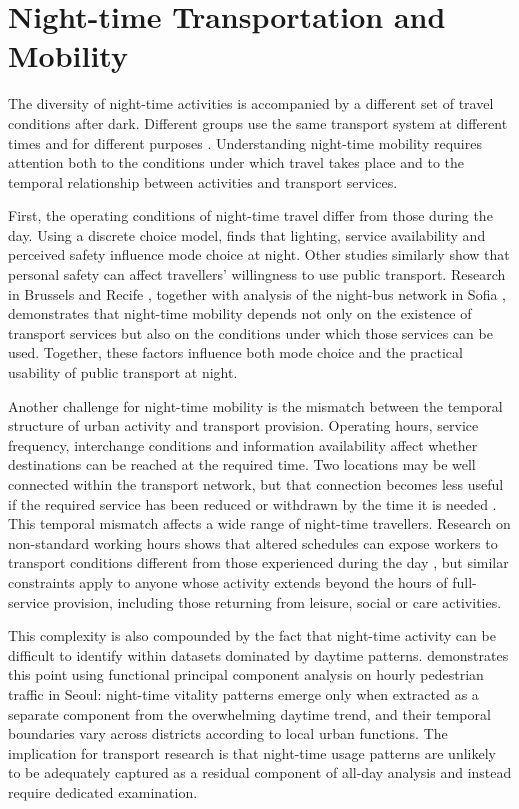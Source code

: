 \section{Night-time Transportation and Mobility}

The diversity of night-time activities is accompanied by a different set of travel conditions after dark. Different groups use the same transport system at different times and for different purposes \citep{Shaw2022,Palm2023}. Understanding night-time mobility requires attention both to the conditions under which travel takes place and to the temporal relationship between activities and transport services.

First, the operating conditions of night-time travel differ from those during the day. Using a discrete choice model, \citet{Kapitza2022} finds that lighting, service availability and perceived safety influence mode choice at night. Other studies similarly show that personal safety can affect travellers' willingness to use public transport. Research in Brussels and Recife \citep{Farina2022}, together with analysis of the night-bus network in Sofia \citep{Plyushteva2020}, demonstrates that night-time mobility depends not only on the existence of transport services but also on the conditions under which those services can be used. Together, these factors influence both mode choice and the practical usability of public transport at night.

Another challenge for night-time mobility is the mismatch between the temporal structure of urban activity and transport provision. Operating hours, service frequency, interchange conditions and information availability affect whether destinations can be reached at the required time. Two locations may be well connected within the transport network, but that connection becomes less useful if the required service has been reduced or withdrawn by the time it is needed \citep{McArthur2019,Ryan2023,Pan2025}. This temporal mismatch affects a wide range of night-time travellers. Research on non-standard working hours shows that altered schedules can expose workers to transport conditions different from those experienced during the day \citep{Plyushteva2019,Lim2024,Kapitza2025}, but similar constraints apply to anyone whose activity extends beyond the hours of full-service provision, including those returning from leisure, social or care activities.

This complexity is also compounded by the fact that night-time activity can be difficult to identify within datasets dominated by daytime patterns. \citet{Kim2020} demonstrates this point using functional principal component analysis on hourly pedestrian traffic in Seoul: night-time vitality patterns emerge only when extracted as a separate component from the overwhelming daytime trend, and their temporal boundaries vary across districts according to local urban functions. The implication for transport research is that night-time usage patterns are unlikely to be adequately captured as a residual component of all-day analysis and instead require dedicated examination.

